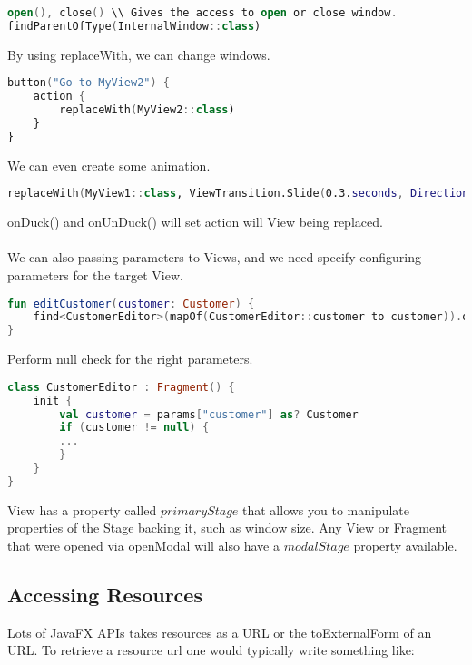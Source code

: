 \documentclass[12pt]{article}
\begin{document}
\begin{lstlisting}[language=Kotlin]
open(), close() \\ Gives the access to open or close window.
findParentOfType(InternalWindow::class)
\end{lstlisting}
By using replaceWith, we can change windows.
\begin{lstlisting}[language=Kotlin]
button("Go to MyView2") {
	action {
		replaceWith(MyView2::class)
	}
}
\end{lstlisting}
We can even create some animation.
\begin{lstlisting}[language=Kotlin]
replaceWith(MyView1::class, ViewTransition.Slide(0.3.seconds, Direction.LEFT))
\end{lstlisting}
onDuck() and onUnDuck() will set action will View being replaced.\\\\
We can also passing parameters to Views, and we need specify configuring parameters for the target View.
\begin{lstlisting}[language=Kotlin]
fun editCustomer(customer: Customer) {
	find<CustomerEditor>(mapOf(CustomerEditor::customer to customer)).openWindow()
}
\end{lstlisting}
Perform null check for the right parameters.
\begin{lstlisting}[language=Kotlin]
class CustomerEditor : Fragment() {
	init {
		val customer = params["customer"] as? Customer
		if (customer != null) {
		...
		}
	}
}
\end{lstlisting}
View has a property called $primaryStage$ that allows you to manipulate properties of the Stage backing it, such as window size. Any View or Fragment that were opened via openModal will also have a $modalStage$ property available.

\subsection{Accessing Resources}
Lots of JavaFX APIs takes resources as a URL or the toExternalForm of an URL. To retrieve a resource url one would typically write something like:
\end{document}
